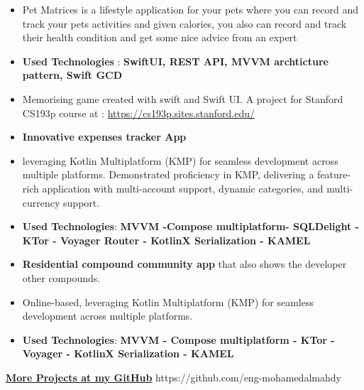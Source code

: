 \documentclass[10pt,a4paper,ragged2e,withhyper]{altacv}
\begin{document}
    \hypertarget{pet_materices}{}
    \begin{itemize}
        \item \textbf{}Pet Matrices is a lifestyle application for your pets where you can record and track your pets activities and given calories, you also can record and track their health condition and get some nice advice from an expert
        \item \textbf{Used Technologies} : \textbf{SwiftUI, REST API, MVVM archticture pattern, Swift GCD}
    \end{itemize}
    \divider

    \begin{itemize}
        \item \textbf{} Memorising game created with swift and Swift UI. \linebreak
        A project for Stanford CS193p course at : \href{https://cs193p.sites.stanford.edu/}{https://cs193p.sites.stanford.edu/}
    \end{itemize}
    \divider


    \vspace{6px}
    \vspace{2px}

    \begin{itemize}
        \item \textbf{Innovative expenses tracker App}
        \item leveraging Kotlin Multiplatform (KMP) for seamless development across multiple platforms.
        Demonstrated proficiency in KMP,
        delivering a feature-rich application with multi-account support, dynamic categories, and multi-currency support.
        \item \textbf{Used Technologies}: \textbf{MVVM -Compose multiplatform- SQLDelight - KTor - Voyager Router - KotlinX Serialization - KAMEL}
    \end{itemize}
    \divider

    \begin{itemize}
        \item \textbf{Residential compound community app} that also shows the developer other compounds.
        \item Online-based, leveraging Kotlin Multiplatform (KMP) for seamless development across multiple platforms.
        \item \textbf{Used Technologies}: \textbf{MVVM - Compose multiplatform - KTor - Voyager - KotlinX Serialization - KAMEL}
    \end{itemize}
    \divider

    \begin{center}
        \textbf{\Large \href{https://github.com/eng-mohamedalmahdy}{More Projects at my GitHub}}
        {\cvrepo{\color{GitHubColor}\faGithub}
        {https://github.com/eng-mohamedalmahdy}}{}{}
    \end{center}
    \divider
\end{document}
